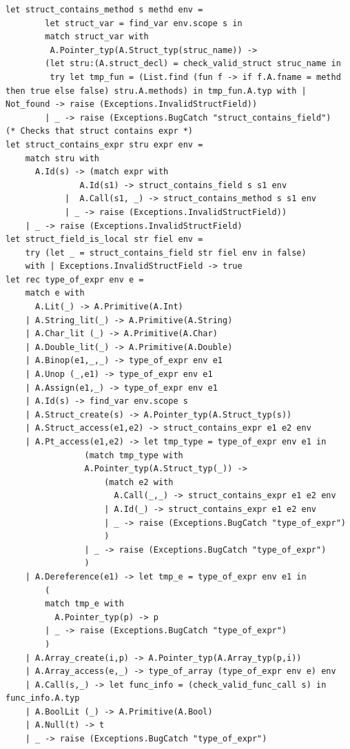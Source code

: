 \documentclass{article}
\begin{document}
\begin{lstlisting}
let struct_contains_method s methd env =
		let struct_var = find_var env.scope s in 
		match struct_var with 
		 A.Pointer_typ(A.Struct_typ(struc_name)) ->
		(let stru:(A.struct_decl) = check_valid_struct struc_name in 
		 try let tmp_fun = (List.find (fun f -> if f.A.fname = methd then true else false) stru.A.methods) in tmp_fun.A.typ with | Not_found -> raise (Exceptions.InvalidStructField))
		| _ -> raise (Exceptions.BugCatch "struct_contains_field")
(* Checks that struct contains expr *)
let struct_contains_expr stru expr env = 
	match stru with
	  A.Id(s) -> (match expr with 
			   A.Id(s1) -> struct_contains_field s s1 env 
			|  A.Call(s1, _) -> struct_contains_method s s1 env
			| _ -> raise (Exceptions.InvalidStructField)) 
	| _ -> raise (Exceptions.InvalidStructField)
let struct_field_is_local str fiel env =
	try (let _ = struct_contains_field str fiel env in false) 
	with | Exceptions.InvalidStructField -> true
let rec type_of_expr env e =
	match e with
	  A.Lit(_) -> A.Primitive(A.Int)
	| A.String_lit(_) -> A.Primitive(A.String)
  	| A.Char_lit (_) -> A.Primitive(A.Char)
  	| A.Double_lit(_) -> A.Primitive(A.Double)
  	| A.Binop(e1,_,_) -> type_of_expr env e1
  	| A.Unop (_,e1) -> type_of_expr env e1
  	| A.Assign(e1,_) -> type_of_expr env e1
  	| A.Id(s) -> find_var env.scope s
	| A.Struct_create(s) -> A.Pointer_typ(A.Struct_typ(s))
	| A.Struct_access(e1,e2) -> struct_contains_expr e1 e2 env
	| A.Pt_access(e1,e2) -> let tmp_type = type_of_expr env e1 in 
				(match tmp_type with
				A.Pointer_typ(A.Struct_typ(_)) -> 
					(match e2 with 
				  	  A.Call(_,_) -> struct_contains_expr e1 e2 env
				  	| A.Id(_) -> struct_contains_expr e1 e2 env
					| _ -> raise (Exceptions.BugCatch "type_of_expr")
					)
				| _ -> raise (Exceptions.BugCatch "type_of_expr")
				)
	| A.Dereference(e1) -> let tmp_e = type_of_expr env e1 in 
		(
		match tmp_e with
		  A.Pointer_typ(p) -> p
		| _ -> raise (Exceptions.BugCatch "type_of_expr")
		)
	| A.Array_create(i,p) -> A.Pointer_typ(A.Array_typ(p,i))
	| A.Array_access(e,_) -> type_of_array (type_of_expr env e) env
	| A.Call(s,_) -> let func_info = (check_valid_func_call s) in func_info.A.typ
  	| A.BoolLit (_) -> A.Primitive(A.Bool)
  	| A.Null(t) -> t
	| _ -> raise (Exceptions.BugCatch "type_of_expr")
	

\end{lstlisting}
\end{document}
